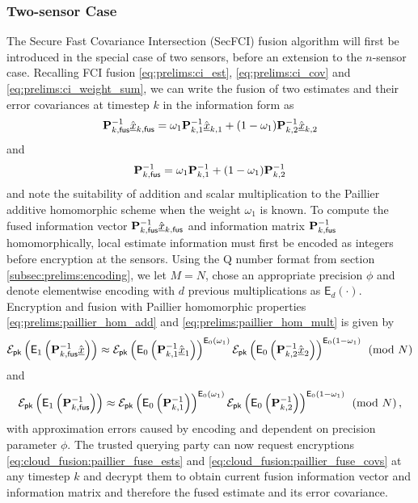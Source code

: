 \subsubsection{Two-sensor Case} \label{subsubsec:cloud_fusion:secfci_2_sen}
The Secure Fast Covariance Intersection (SecFCI) fusion algorithm will first be introduced in the special case of two sensors, before an extension to the $n$-sensor case. Recalling FCI fusion \eqref{eq:prelims:ci_est}, \eqref{eq:prelims:ci_cov} and \eqref{eq:prelims:ci_weight_sum}, we can write the fusion of two estimates and their error covariances at timestep $k$ in the information form as
\begin{equation}
    {\ensuremath{{\mathbf{P}}}}_{k,\mathsf{fus}}^{-1}\hat{{\underline{x}}}_{k,\mathsf{fus}} = \omega_1{{\mathbf{P}}}_{k,1}^{-1}\hat{{\underline{x}}}_{k,1} + (1 - \omega_1){{\mathbf{P}}}_{k,2}^{-1}\hat{{\underline{x}}}_{k,2}
\end{equation}
and
\begin{equation}
    {\ensuremath{{\mathbf{P}}}}_{k,\mathsf{fus}}^{-1} = \omega_1{{\mathbf{P}}}_{k,1}^{-1} + (1 - \omega_1){{\mathbf{P}}}_{k,2}^{-1}
\end{equation}
and note the suitability of addition and scalar multiplication to the Paillier additive homomorphic scheme when the weight $\omega_1$ is known. To compute the fused information vector ${{\mathbf{P}}}_{k,\mathsf{fus}}^{-1}\hat{{\underline{x}}}_{k,\mathsf{fus}}$ and information matrix ${{\mathbf{P}}}_{k,\mathsf{fus}}^{-1}$ homomorphically, local estimate information must first be encoded as integers before encryption at the sensors. Using the Q number format from section \ref{subsec:prelims:encoding}, we let $M=N$, chose an appropriate precision $\phi$ and denote elementwise encoding with $d$ previous multiplications as $\mathsf{E}_d(\cdot)$. Encryption and fusion with Paillier homomorphic properties \eqref{eq:prelims:paillier_hom_add} and \eqref{eq:prelims:paillier_hom_mult} is given by
\begin{equation}\label{eq:cloud_fusion:paillier_fuse_ests}
    \mathcal{E}_{\mathsf{pk}}\left(\mathsf{E}_1\left({{\mathbf{P}}}_{k,\mathsf{fus}}^{-1}\hat{{\underline{x}}}\right)\right) \approx \mathcal{E}_{\mathsf{pk}}\left(\mathsf{E}_0\left({{\mathbf{P}}}^{-1}_{k,1}\hat{{\underline{x}}}_1\right)\right)^{\mathsf{E}_0(\omega_1)}\mathcal{E}_{\mathsf{pk}}\left(\mathsf{E}_0\left({{\mathbf{P}}}^{-1}_{k,2}\hat{{\underline{x}}}_2\right)\right)^{\mathsf{E}_0(1 - \omega_1)}\pmod{N}
\end{equation}
and
\begin{equation}\label{eq:cloud_fusion:paillier_fuse_covs}
    \mathcal{E}_{\mathsf{pk}}\left(\mathsf{E}_1\left({{\mathbf{P}}}_{k,\mathsf{fus}}^{-1}\right)\right) \approx \mathcal{E}_{\mathsf{pk}}\left(\mathsf{E}_0\left({{\mathbf{P}}}^{-1}_{k,1}\right)\right)^{\mathsf{E}_0(\omega_1)}\mathcal{E}_{\mathsf{pk}}\left(\mathsf{E}_0\left({{\mathbf{P}}}^{-1}_{k,2}\right)\right)^{\mathsf{E}_0(1 -\omega_1)}\pmod{N}\,,
\end{equation}
with approximation errors caused by encoding and dependent on precision parameter $\phi$. The trusted querying party can now request encryptions \eqref{eq:cloud_fusion:paillier_fuse_ests} and \eqref{eq:cloud_fusion:paillier_fuse_covs} at any timestep $k$ and decrypt them to obtain current fusion information vector and information matrix and therefore the fused estimate and its error covariance.

